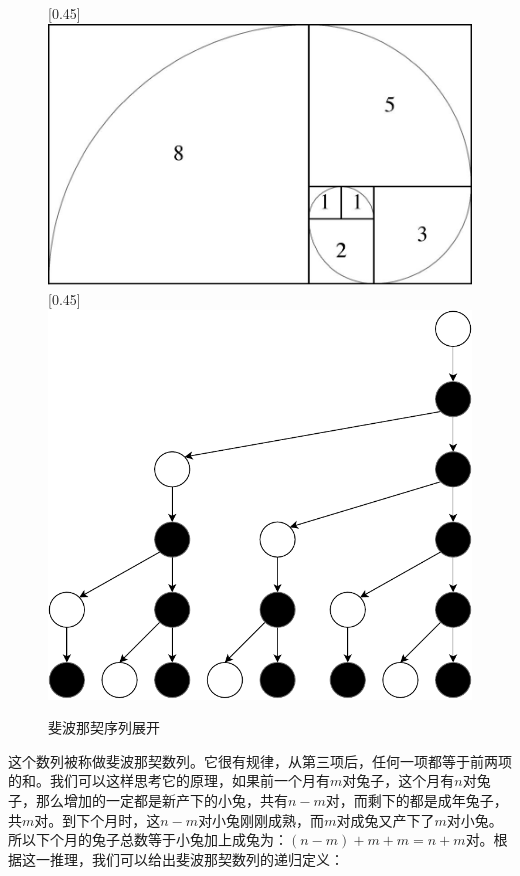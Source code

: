 \documentclass[b5paper]{ctexart}
\begin{document}
\begin{figure}[htbp]
 \centering
 [0.45\linewidth]{
     \includegraphics[scale=0.4]{img/fibonacci_spiral}}
 [0.45\linewidth]{
     \includegraphics[scale=0.4]{img/Fibonacci-rabbits}}
 \caption{斐波那契序列展开}
\end{figure}

这个数列被称做斐波那契数列。它很有规律，从第三项后，任何一项都等于前两项的和。我们可以这样思考它的原理，如果前一个月有$m$对兔子，这个月有$n$对兔子，那么增加的一定都是新产下的小兔，共有$n-m$对，而剩下的都是成年兔子，共$m$对。到下个月时，这$n-m$对小兔刚刚成熟，而$m$对成兔又产下了$m$对小兔。所以下个月的兔子总数等于小兔加上成兔为：$(n - m) + m + m = n + m$对。根据这一推理，我们可以给出斐波那契数列的递归定义：
\end{document}
